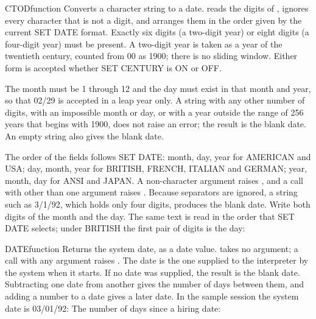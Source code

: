 \begin{XbaseEntry}{CTOD}{function}
Converts a character string to a date.
\Syntax
{}
\Usage
{} reads the digits of , ignores every character that is not a digit, and arranges them in the order given by the current SET DATE format. Exactly six digits (a two-digit year) or eight digits (a four-digit year) must be present. A two-digit year is taken as a year of the twentieth century, counted from 00 as 1900; there is no sliding window. Either form is accepted whether SET CENTURY is ON or OFF.

The month must be 1 through 12 and the day must exist in that month and year, so that 02/29 is accepted in a leap year only. A string with any other number of digits, with an impossible month or day, or with a year outside the range of 256 years that begins with 1900, does not raise an error; the result is the blank date. An empty string also gives the blank date.

The order of the fields follows SET DATE: month, day, year for AMERICAN and USA; day, month, year for BRITISH, FRENCH, ITALIAN and GERMAN; year, month, day for ANSI and JAPAN. A non-character argument raises , and a call with other than one argument raises .
\Tips
Because separators are ignored, a string such as 3/1/92, which holds only four digits, produces the blank date. Write both digits of the month and the day.
\Examples
{}
The same text is read in the order that SET DATE selects; under BRITISH the first pair of digits is the day:
\end{XbaseEntry}

\begin{XbaseEntry}{DATE}{function}
Returns the system date, as a date value.
\Syntax
{}
\Usage
{} takes no argument; a call with any argument raises . The date is the one supplied to the interpreter by the system when it starts. If no date was supplied, the result is the blank date. Subtracting one date from another gives the number of days between them, and adding a number to a date gives a later date.
\Examples
In the sample session the system date is 03/01/92:
The number of days since a hiring date:
\end{XbaseEntry}

